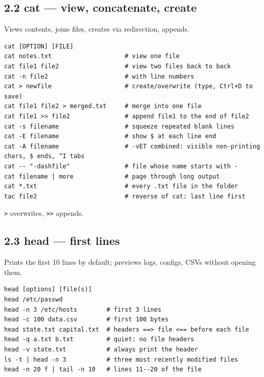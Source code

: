 \documentclass[11pt,a4paper]{article}
\newcommand{\cmd}[1]{\texttt{#1}}
\begin{document}
\subsection{2.2 cat --- view, concatenate, create}
Views contents, joins files, creates via redirection, appends.
\begin{lstlisting}
cat [OPTION] [FILE]
cat notes.txt                    # view one file
cat file1 file2                  # view two files back to back
cat -n file2                     # with line numbers
cat > newfile                    # create/overwrite (type, Ctrl+D to save)
cat file1 file2 > merged.txt     # merge into one file
cat file1 >> file2               # append file1 to the end of file2
cat -s filename                  # squeeze repeated blank lines
cat -E filename                  # show $ at each line end
cat -A filename                  # -vET combined: visible non-printing chars, $ ends, ^I tabs
cat -- "-dashfile"               # file whose name starts with -
cat filename | more              # page through long output
cat *.txt                        # every .txt file in the folder
tac file2                        # reverse of cat: last line first
\end{lstlisting}
\cmd{>} overwrites, \cmd{>>} appends.

\subsection{2.3 head --- first lines}
Prints the first 10 lines by default; previews logs, configs, CSVs without opening them.
\begin{lstlisting}
head [options] [file(s)]
head /etc/passwd
head -n 3 /etc/hosts        # first 3 lines
head -c 100 data.csv        # first 100 bytes
head state.txt capital.txt  # headers ==> file <== before each file
head -q a.txt b.txt         # quiet: no file headers
head -v state.txt           # always print the header
ls -t | head -n 3           # three most recently modified files
head -n 20 f | tail -n 10   # lines 11--20 of the file
\end{lstlisting}
\end{document}
